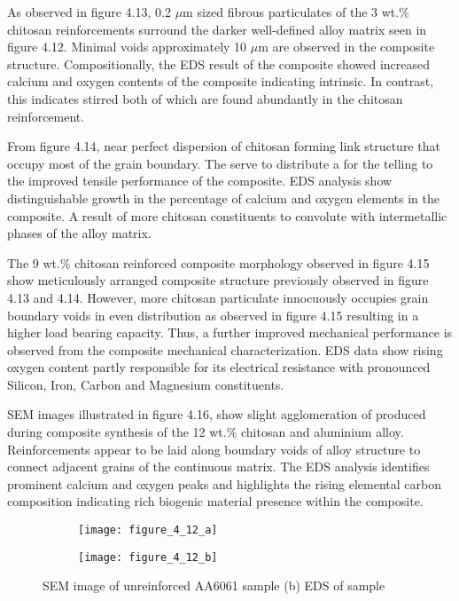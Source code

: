 \documentclass{article}
\begin{document}
\begin{multicols}{2}
                As observed in figure 4.13, 0.2 $\mu$m sized fibrous particulates of the 3 wt.\% chitosan reinforcements surround the darker well-defined alloy matrix seen in figure 4.12. Minimal voids approximately 10 $\mu$m are observed in the composite structure. Compositionally, the EDS result of the composite showed increased calcium and oxygen contents of the composite indicating intrinsic. In contrast, this indicates stirred both of which are found abundantly in the chitosan reinforcement.

                From figure 4.14, near perfect dispersion of chitosan forming link structure that occupy most of the grain boundary. The serve to distribute a for the telling to the improved tensile performance of the composite. EDS analysis show distinguishable growth in the percentage of calcium and oxygen elements in the composite. A result of more chitosan constituents to convolute with intermetallic phases of the alloy matrix.

                The 9 wt.\% chitosan reinforced composite morphology observed in figure 4.15 show meticulously arranged composite structure previously observed in figure 4.13 and 4.14. However, more chitosan particulate innocuously occupies grain boundary voids in even distribution as observed in figure 4.15 resulting in a higher load bearing capacity. Thus, a further improved mechanical performance is observed from the composite mechanical characterization. EDS data show rising oxygen content partly responsible for its electrical resistance with pronounced Silicon, Iron, Carbon and Magnesium constituents.

                SEM images illustrated in figure 4.16, show slight agglomeration of produced during composite synthesis of the 12 wt.\% chitosan and aluminium alloy. Reinforcements appear to be laid along boundary voids of alloy structure to connect adjacent grains of the continuous matrix. The EDS analysis identifies prominent calcium and oxygen peaks and highlights the rising elemental carbon composition indicating rich biogenic material presence within the composite.
                \begin{figure}[H]
                    \begin{subfigure}{.25\textwidth}
                        \texttt{[image: figure\_4\_12\_a]}
                        \label{fig:figure_4_12_a}
                    \end{subfigure}%
                    \begin{subfigure}{.25\textwidth}
                        \texttt{[image: figure\_4\_12\_b]}
                        \label{fig:figure_4_12_b}
                    \end{subfigure}
                    \caption{SEM image of unreinforced AA6061 sample (b) EDS of sample}
                \end{figure}


\end{multicols}
\end{document}
